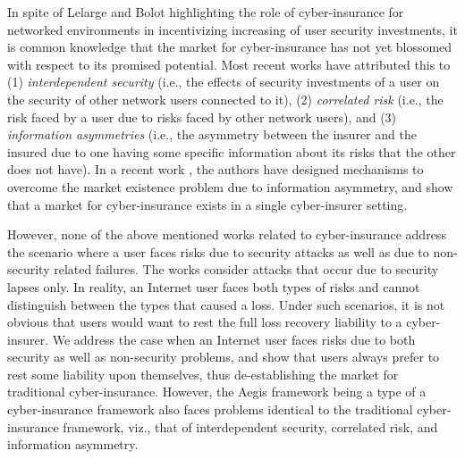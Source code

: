 \documentclass[letterpaper,12pt, onecolumn, nodraft]{IEEEtran}
\begin{document}
In spite of Lelarge and Bolot highlighting the role of cyber-insurance for
networked environments in incentivizing increasing of user security investments,
it is common knowledge that the market for cyber-insurance has not yet
blossomed with respect to its promised potential. Most recent works \cite{rabohme} \cite{ssfw} have
attributed this to
(1) \emph{interdependent security} (i.e., the effects of security investments
of a user on the security of other network users connected to it),
(2) \emph{correlated risk} (i.e., the risk faced by a user due to risks
faced by other network users),
and (3) \emph{information asymmetries} (i.e., the asymmetry between the insurer
and the insured due to one having some specific information about its risks
that the other does not have). In a recent work \cite{plg}, the authors have designed mechanisms to overcome the market existence problem due to information asymmetry, and show that a market for cyber-insurance exists in a single cyber-insurer setting.

However, none of the above mentioned works related to cyber-insurance address the scenario where a user faces risks due to security attacks as well as due to non-security related failures. The works consider attacks that occur due to security lapses only. In reality, an Internet user faces both types of risks and cannot distinguish between the types that caused a loss. Under such scenarios, it is not obvious that users would want to rest the full loss recovery liability to a cyber-insurer. We address the case when an Internet user faces risks due to both security as well as non-security problems, and show that users always prefer to rest some liability upon themselves, thus de-establishing the market for traditional cyber-insurance.
However, the Aegis framework being a type of a cyber-insurance framework also faces problems identical to the traditional cyber-insurance framework, viz., that of interdependent security, correlated risk, and information asymmetry. 
\end{document}

